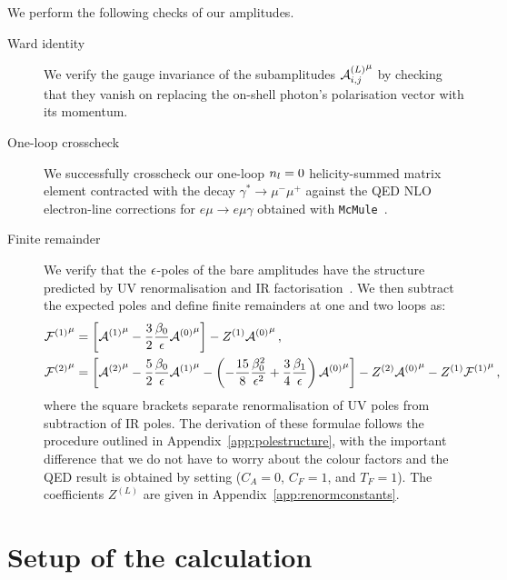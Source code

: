 \documentclass[main.tex]{subfiles}
\begin{document}
\smallskip

We perform the following checks of our amplitudes.
\begin{description}
    \item[Ward identity]
        We verify the gauge invariance of the subamplitudes ${\mathcal{A}^{(L)}_{i, j}}^{\mu}$ by checking that they vanish on replacing the on-shell photon's polarisation vector with its momentum.

    \item[One-loop crosscheck]
        We successfully crosscheck our one-loop $n_l=0$ helicity-summed matrix element contracted with the decay $\gamma^*\to\mu^-\mu^+$ against the QED NLO electron-line corrections for $e\mu\to e\mu\gamma$ obtained with \texttt{McMule}~\cite{Banerjee:2020rww,ulrich_yannick_2022_6046769}.

    \item[Finite remainder]
      We verify that the $\epsilon$-poles of the bare amplitudes have the structure predicted by UV renormalisation and IR factorisation~\cite{Catani:1998bh,Gardi:2009qi,Gardi:2009zv,Becher:2009cu,Becher:2009qa}. We then subtract the expected poles and define finite remainders at one and two loops as:
        \begin{subequations}
            \label{eqQED:finite-remainders}
            \begin{align}
                {\mathcal{F}^{(1)}}^\mu &= \left[ {\mathcal{A}^{(1)}}^{\mu} - \frac{3}{2}\frac{\beta_0}{\epsilon} {\mathcal{A}^{(0)}}^{\mu} \right] - Z^{(1)} {\mathcal{A}^{(0)}}^{\mu} \,,\\
                {\mathcal{F}^{(2)}}^\mu &= \left[ {\mathcal{A}^{(2)}}^{\mu} - \frac{5}{2}\frac{\beta_0}{\epsilon} {\mathcal{A}^{(1)}}^{\mu} - \left(-\frac{15}{8}\frac{\beta_0^2}{\epsilon^2}+\frac{3}{4}\frac{\beta_1}{\epsilon}\right) {\mathcal{A}^{(0)}}^{\mu} \right] - Z^{(2)} {\mathcal{A}^{(0)}}^{\mu} - Z^{(1)} {\mathcal{F}^{(1)}}^\mu \,,
            \end{align}
        \end{subequations}
        where the square brackets separate renormalisation of UV poles from subtraction of IR poles. The derivation of these formulae follows the procedure outlined in Appendix~\ref{app:polestructure}, with the important difference that we do not have to worry about the colour factors and the QED result is obtained by setting ($C_A=0$, $C_F=1$, and $T_F=1$). The coefficients $Z^{(L)}$ are given in Appendix~\ref{app:renormconstants}.
\end{description}

\section{Setup of the calculation}
\label{secQED:calc}
\end{document}
